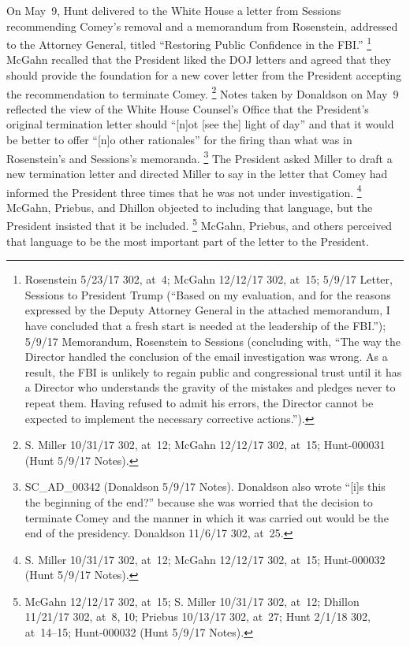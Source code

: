 On May~9, Hunt delivered to the White House a letter from Sessions recommending Comey's removal and a memorandum from Rosenstein, addressed to the Attorney General, titled ``Restoring Public Confidence in the FBI.''%
\footnote{Rosenstein 5/23/17 302, at~4;
McGahn 12/12/17 302, at~15;
5/9/17 Letter, Sessions to President Trump (``Based on my evaluation, and for the reasons expressed by the Deputy Attorney General in the attached memorandum, I have concluded that a fresh start is needed at the leadership of the FBI.'');
5/9/17 Memorandum, Rosenstein to Sessions (concluding with, ``The way the Director handled the conclusion of the email investigation was wrong.
As a result, the FBI is unlikely to regain public and congressional trust until it has a Director who understands the gravity of the mistakes and pledges never to repeat them.
Having refused to admit his errors, the Director cannot be expected to implement the necessary corrective actions.'').}
McGahn recalled that the President liked the DOJ letters and agreed that they should provide the foundation for a new cover letter from the President accepting the recommendation to terminate Comey.%
\footnote{S. Miller 10/31/17 302, at~12;
McGahn 12/12/17 302, at~15;
Hunt-000031 (Hunt 5/9/17 Notes).}
Notes taken by Donaldson on May~9 reflected the view of the White House Counsel's Office that the President's original termination letter should ``[n]ot [see the] light of day'' and that it would be better to offer ``[n]o other rationales'' for the firing than what was in Rosenstein's and Sessions's memoranda.%
\footnote{SC\_AD\_00342 (Donaldson 5/9/17 Notes).
Donaldson also wrote ``[i]s this the beginning of the end?'' because she was worried that the decision to terminate Comey and the manner in which it was carried out would be the end of the presidency.
Donaldson 11/6/17 302, at~25.}
The President asked Miller to draft a new termination letter and directed Miller to say in the letter that Comey had informed the President three times that he was not under investigation.%
\footnote{S. Miller 10/31/17 302, at~12;
McGahn 12/12/17 302, at~15;
Hunt-000032 (Hunt 5/9/17 Notes).}
McGahn, Priebus, and Dhillon objected to including that language, but the President insisted that it be included.%
\footnote{McGahn 12/12/17 302, at~15;
S. Miller 10/31/17 302, at~12;
Dhillon 11/21/17 302, at~8, 10;
Priebus 10/13/17 302, at~27;
Hunt 2/1/18 302, at~14--15;
Hunt-000032 (Hunt 5/9/17 Notes).}
McGahn, Priebus, and others perceived that language to be the most important part of the letter to the President.%
